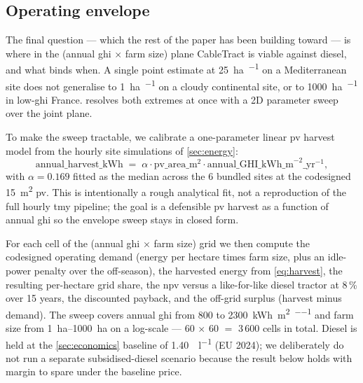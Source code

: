 \documentclass[11pt,a4paper]{article}
\begin{document}
\subsection{Operating envelope}\label{sec:envelope}

The final question --- which the rest of the paper has been building toward --- is where in the (annual \gls{ghi} $\times$ farm size) plane CableTract is viable against diesel, and what binds when. A single point estimate at \SI{25}{\hectare\per\year} on a Mediterranean site does not generalise to \SI{1}{\hectare\per\year} on a cloudy continental site, or to \SI{1000}{\hectare\per\year} in low-\gls{ghi} France.  resolves both extremes at once with a 2D parameter sweep over the joint plane.

To make the sweep tractable, we calibrate a one-parameter linear \gls{pv} harvest model from the hourly site simulations of \cref{sec:energy}:
\begin{equation}\label{eq:harvest}
\text{annual\_harvest\_kWh} \;=\; \alpha \cdot \text{pv\_area\_m}^{2} \cdot \text{annual\_GHI\_kWh\_m}^{-2}\text{\_yr}^{-1},
\end{equation}
with $\alpha = 0.169$ fitted as the median across the 6 bundled sites at the codesigned \SI{15}{\meter\squared} \gls{pv}. This is intentionally a rough analytical fit, not a reproduction of the full hourly \gls{tmy} pipeline; the goal is a defensible \gls{pv} harvest as a function of annual \gls{ghi} so the envelope sweep stays in closed form.

For each cell of the (annual \gls{ghi} $\times$ farm size) grid we then compute the codesigned operating demand (energy per hectare times farm size, plus an idle-power penalty over the off-season), the harvested energy from \cref{eq:harvest}, the resulting per-hectare grid share, the \gls{npv} versus a like-for-like diesel tractor at 8\,\% over 15 years, the discounted payback, and the off-grid surplus (harvest minus demand). The sweep covers annual \gls{ghi} from 800 to \SI{2300}{\kWh\per\meter\squared\per\year} and farm size from \SIrange{1}{1000}{\hectare} on a log-scale --- 60 $\times$ 60 $=$ 3\,600 cells in total. Diesel is held at the \cref{sec:economics} baseline of \SI{1.40}{\EUR\per\litre} (EU 2024); we deliberately do not run a separate subsidised-diesel scenario because the result below holds with margin to spare under the baseline price.
\end{document}
